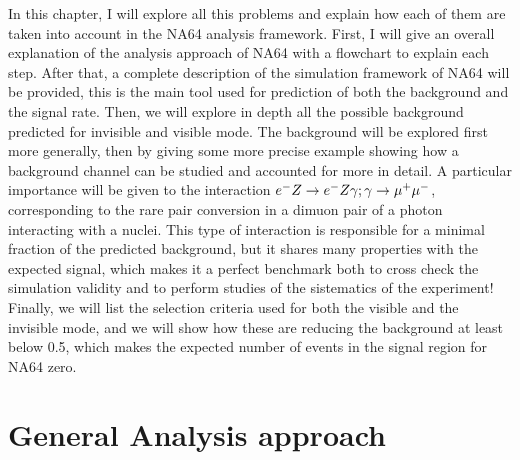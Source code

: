 In this chapter, I will explore all this problems and explain how each of them are taken into account in the NA64 analysis framework. First, I will give an overall explanation of the analysis approach of NA64 with a flowchart to explain each step. After that, a complete description of the simulation framework of NA64 will be provided, this is the main tool used for prediction of both the background and the signal rate. Then, we will explore in depth all the possible background predicted for invisible and visible mode. The background will be explored first more generally, then by giving some more precise example showing how a background channel can be studied and accounted for more in detail. A particular importance will be given to the interaction $e^- Z \to e^- Z \gamma; \gamma \to \mu^+ \mu^-$, corresponding to the rare pair conversion in a dimuon pair of a photon interacting with a nuclei. This type of interaction is responsible for a minimal fraction of the predicted background, but it shares many properties with the expected signal, which makes it a perfect benchmark both to cross check the simulation validity and to perform studies of the sistematics of the experiment! Finally, we will list the selection criteria used for both the visible and the invisible mode, and we will show how these are reducing the background at least below 0.5, which makes the expected number of events in the signal region for NA64 zero.


\section{General Analysis approach}
\label{ch3:sec:analysis-approach}

